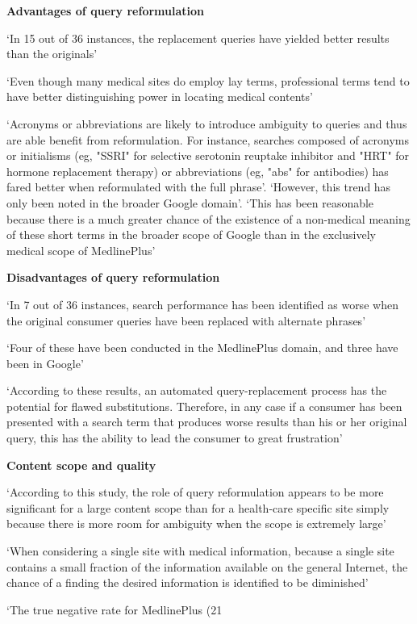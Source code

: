 \documentclass[]{article}
\begin{document}
{{{\textbf{Advantages of query reformulation}

‘In 15 out of 36 instances, the replacement queries have yielded better results than the originals’

‘Even though many medical sites do employ lay terms, professional terms tend to have better distinguishing power in locating medical contents’

‘Acronyms or abbreviations are likely to introduce ambiguity to queries and thus are able benefit from reformulation. For instance, searches composed of acronyms or initialisms (eg, "SSRI" for selective serotonin reuptake inhibitor and "HRT" for hormone replacement therapy) or abbreviations (eg, "abs" for antibodies) has fared better when reformulated with the full phrase’. ‘However, this trend has only been noted in the broader Google domain’. ‘This has been reasonable because there is a much greater chance of the existence of a non-medical meaning of these short terms in the broader scope of Google than in the exclusively medical scope of MedlinePlus’

\textbf{Disadvantages of query reformulation}

‘In 7 out of 36 instances, search performance has been identified as worse when the original consumer queries have been replaced with alternate phrases’

‘Four of these have been conducted in the MedlinePlus domain, and three have been in Google’

‘According to these results, an automated query-replacement process has the potential for flawed substitutions. Therefore, in any case if a consumer has been presented with a search term that produces worse results than his or her original query, this has the ability to lead the consumer to great frustration’
 
\textbf{Content scope and quality}

‘According to this study, the role of query reformulation appears to be more significant for a large content scope than for a health-care specific site simply because there is more room for ambiguity when the scope is extremely large’

‘When considering a single site with medical information, because a single site contains a small fraction of the information available on the general Internet, the chance of a finding the desired information is identified to be diminished’

‘The true negative rate for MedlinePlus (21%

}}}
\end{document}
